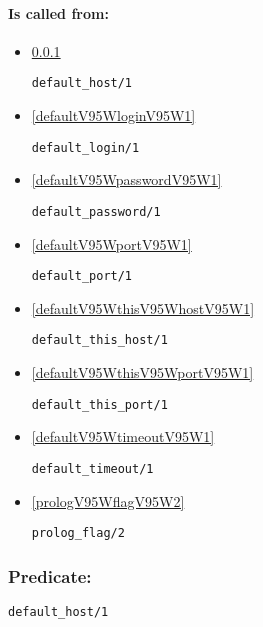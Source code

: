 \paragraph{Is called from:} 
\begin{itemize}
\item \ref{defaultV95WhostV95W1} 
\begin{verbatim}
default_host/1
\end{verbatim}

\item \ref{defaultV95WloginV95W1} 
\begin{verbatim}
default_login/1
\end{verbatim}

\item \ref{defaultV95WpasswordV95W1} 
\begin{verbatim}
default_password/1
\end{verbatim}

\item \ref{defaultV95WportV95W1} 
\begin{verbatim}
default_port/1
\end{verbatim}

\item \ref{defaultV95WthisV95WhostV95W1} 
\begin{verbatim}
default_this_host/1
\end{verbatim}

\item \ref{defaultV95WthisV95WportV95W1} 
\begin{verbatim}
default_this_port/1
\end{verbatim}

\item \ref{defaultV95WtimeoutV95W1} 
\begin{verbatim}
default_timeout/1
\end{verbatim}

\item \ref{prologV95WflagV95W2} 
\begin{verbatim}
prolog_flag/2
\end{verbatim}

\end{itemize}

\subsubsection{Predicate:} \label{defaultV95WhostV95W1}

\begin{verbatim}
default_host/1
\end{verbatim}

